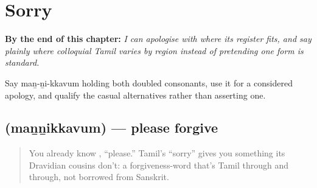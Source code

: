 
\chapter{Sorry}
\label{ch:ta-sorry}

\begin{chapteropening}
\textbf{By the end of this chapter:} \emph{I can apologise with  where its register fits, and say plainly where colloquial Tamil varies by region instead of pretending one form is standard.}

Say maṉ-ṉi-kkavum holding both doubled consonants, use it for a considered apology, and qualify the casual alternatives rather than asserting one.
\end{chapteropening}

\section[\texorpdfstring{\ta{மன்னிக்கவும்} (maṉṉikkavum)}{மன்னிக்கவும் (maṉṉikkavum)}]{ (maṉṉikkavum) — please forgive}

\label{lesson:TA-C09-mannikkavum}



\begin{quote}
You already know \textbf{}, \textquotedblleft{}please.\textquotedblright{} Tamil's \textquotedblleft{}sorry\textquotedblright{} gives you something its Dravidian cousins don't: a forgiveness-word that's Tamil through and through, not borrowed from Sanskrit.
\end{quote}

